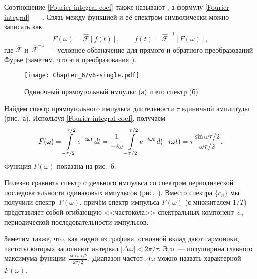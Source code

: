 Соотношение \eqref{Fourier integral-coef} также называют
, а формулу \eqref{Fourier integral}~---
.
Связь между функцией и её спектром символически можно записать как
\begin{equation*}
F(\omega) = \hat{\mathcal{F}}[f(t)],\qquad 
f(t) = \hat{\mathcal{F}}^{-1}[F(\omega)],
\end{equation*}
где $\hat{\mathcal{F}}$ и~$\hat{\mathcal{F}}^{-1}$~--- условное обозначение
для прямого и обратного преобразований Фурье (заметим, что
эти преобразования ).

\begin{figure}[h!]
    \centering\texttt{[image: Chapter\_6/v6-single.pdf]}
    \caption{Одиночный прямоугольный импульс (а) и его спектр (б)}
\end{figure}

\begin{lab:example}\label{example:square}
Найдём спектр прямоугольного импульса длительности $\tau$
единичной амплитуды (рис.~а). Используя
\eqref{Fourier integral-coef}, получаем
\begin{equation}
    \eqmark{spectrum-impulse}
    F(\omega)=\int\limits_{-\tau/2}^{\tau/2} e^{-i\omega
t}\,dt=\frac{1}{-i\omega}\int\limits_{-\tau/2}^{\tau/2} e^{-i\omega t}\,
d(-i\omega t)=\tau\frac{\sin\omega\tau/2}{\omega\tau/2}.
\end{equation}
Функция $F(\omega)$ показана на рис.~б.

Полезно сравнить спектр отдельного импульса со спектром периодической
последовательности одинаковых импульсов (рис.~).
Вместо  спектра $\{c_n\}$ мы получили
 спектр~$F(\omega)$, причём
спектр импульса $F(\omega)$ (с множителем $1/T$) представляет собой
огибающую <<частокола>> спектральных компонент~$c_n$
периодической последовательности импульсов.

Заметим также, что, как видно из графика, основной вклад дают гармоники, частоты
которых заполняют интервал $|\Delta\omega|<2\pi/\tau$. Это~--- полуширина
главного максимума функции $\frac{\sin\omega\tau/2}{\omega\tau/2}$. Диапазон
частот $\Delta\omega$ можно назвать характерной 
$F(\omega)$.
\end{lab:example}


\label{sec:indeterminacy}

